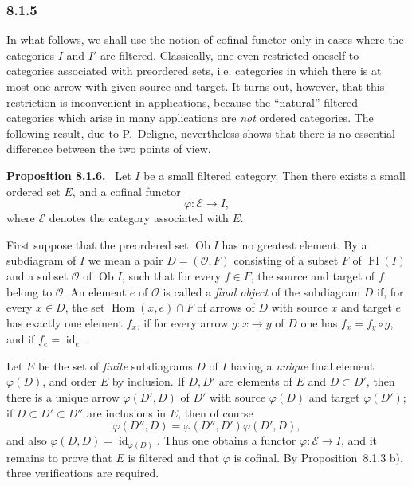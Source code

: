 \documentclass[11pt]{article}
\newcommand{\Ob}{\operatorname{Ob}}
\newcommand{\Hom}{\operatorname{Hom}}
\newcommand{\Fl}{\operatorname{Fl}}
\newcommand{\id}{\operatorname{id}}
\newenvironment{statement}[1]{\par\medskip\noindent\textbf{#1.}\ }{\par\medskip}
\begin{document}
\subsubsection*{8.1.5}
In what follows, we shall use the notion of cofinal functor only in cases where the categories $I$ and $I'$ are filtered. Classically, one even restricted oneself to categories associated with preordered sets, i.e. categories in which there is at most one arrow with given source and target. It turns out, however, that this restriction is inconvenient in applications, because the ``natural'' filtered categories which arise in many applications are \emph{not} ordered categories. The following result, due to P.~Deligne, nevertheless shows that there is no essential difference between the two points of view.

\begin{statement}{Proposition 8.1.6}
Let $I$ be a small filtered category. Then there exists a small ordered set $E$, and a cofinal functor
\[
\varphi:\mathcal E\longrightarrow I,
\]
where $\mathcal E$ denotes the category associated with $E$.
\end{statement}

First suppose that the preordered set $\Ob I$ has no greatest element. By a subdiagram of $I$ we mean a pair $D=(\mathcal O,F)$ consisting of a subset $F$ of $\Fl(I)$ and a subset $\mathcal O$ of $\Ob I$, such that for every $f\in F$, the source and target of $f$ belong to $\mathcal O$. An element $e$ of $\mathcal O$ is called a \emph{final object} of the subdiagram $D$ if, for every $x\in D$, the set $\Hom(x,e)\cap F$ of arrows of $D$ with source $x$ and target $e$ has exactly one element $f_x$, if for every arrow $g:x\to y$ of $D$ one has $f_x=f_y\circ g$, and if $f_e=\id_e$.

Let $E$ be the set of \emph{finite} subdiagrams $D$ of $I$ having a \emph{unique} final element $\varphi(D)$, and order $E$ by inclusion. If $D,D'$ are elements of $E$ and $D\subset D'$, then there is a unique arrow $\varphi(D',D)$ of $D'$ with source $\varphi(D)$ and target $\varphi(D')$; if $D\subset D'\subset D''$ are inclusions in $E$, then of course
\[
\varphi(D'',D)=\varphi(D'',D')\varphi(D',D),
\]
and also $\varphi(D,D)=\id_{\varphi(D)}$. Thus one obtains a functor $\varphi:\mathcal E\to I$, and it remains to prove that $E$ is filtered and that $\varphi$ is cofinal. By Proposition~8.1.3 b), three verifications are required.
\end{document}

